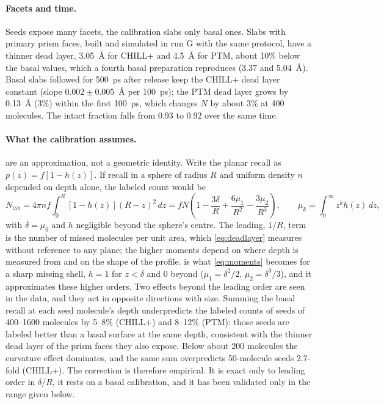 \documentclass[11pt,a4paper]{article}
\begin{document}
\paragraph{Facets and time.} Seeds expose many facets, the calibration slabs
only basal ones. Slabs with primary prism faces, built and simulated in run G
with the same protocol, have a thinner dead layer, 3.05~\AA{} for CHILL+ and
4.5~\AA{} for PTM, about 10\% below the basal values, which a fourth basal
preparation reproduces (3.37 and 5.04~\AA). Basal slabs followed for 500~ps
after release keep the CHILL+ dead layer constant (slope $0.002\pm0.005$~\AA{}
per 100~ps); the PTM dead layer grows by 0.13~\AA{} (3\%) within the first
100~ps, which changes $N$ by about 3\% at 400 molecules. The intact fraction
falls from 0.93 to 0.92 over the same time.

\paragraph{What the calibration assumes.}  are
an approximation, not a geometric identity. Write the planar recall as
$p(z)=f[1-h(z)]$. If recall in a sphere of radius $R$ and uniform density $n$
depended on depth alone, the labeled count would be
\begin{equation}
  N_\mathrm{lab}=4\pi n f\int_0^R[1-h(z)](R-z)^2\,dz
  = fN\left(1-\frac{3\delta}{R}+\frac{6\mu_1}{R^2}-\frac{3\mu_2}{R^3}\right),
  \qquad \mu_k=\int_0^\infty z^k h(z)\,dz ,
  \label{eq:moments}
\end{equation}
with $\delta=\mu_0$ and $h$ negligible beyond the sphere's centre. The leading,
$1/R$, term is the number of missed molecules per unit area, which
\cref{eq:deadlayer} measures without reference to any plane; the higher
moments depend on where depth is measured from and on the shape of the
profile.  is what \cref{eq:moments} becomes for a sharp
missing shell, $h=1$ for $z<\delta$ and 0 beyond ($\mu_1=\delta^2/2$,
$\mu_2=\delta^3/3$), and it approximates these higher orders. Two effects
beyond the leading order are seen in the data, and they act in opposite
directions with size. Summing the basal recall at each seed molecule's depth
underpredicts the labeled counts of seeds of 400--1600 molecules by 5--8\%
(CHILL+) and 8--12\% (PTM): those seeds are labeled better than a basal
surface at the same depth, consistent with the thinner dead layer of the
prism faces they also expose. Below about 200 molecules the curvature effect
dominates, and the same sum overpredicts 50-molecule seeds 2.7-fold (CHILL+).
The correction is therefore empirical. It is exact only to leading order in
$\delta/R$, it rests on a basal calibration, and it has been validated only
in the range given below.
\end{document}
